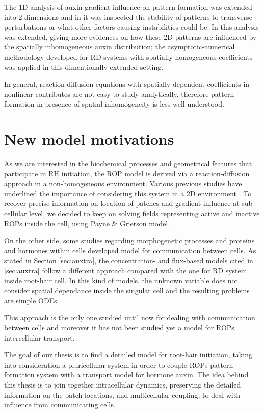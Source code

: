 The 1D analysis of auxin gradient influence on pattern formation was extended into 2 dimensions and in \cite{intra2} it was inspected the stability of patterns to transverse perturbations or what other factors causing instabilities could be. In \cite{intra1_R} this analysis was extended, giving more evidences on how these 2D patterns are influenced by the spatially inhomogeneous auxin distribution; the asymptotic-numerical methodology developed for RD systems with spatially homogeneous coefficients was applied in this dimentionally extended setting.

In general, reaction-diffusion equations with spatially dependent coefficients in nonlinear contributes are not easy to study analytically, therefore pattern formation in presence of spatial inhomogeneity is less well understood.

\section{New model motivations}
As we are interested in the biochemical processes and geometrical features that participate in RH initiation, the ROP model is derived via a reaction-diffusion approach in a non-homogeneous environment. Various previous studies have underlined the importance of considering this system in a 2D environment \cite{phdthesis:victor, intra2, intra1_R}. To recover precise information on location of patches and gradient influence at sub-cellular level, we decided to keep on solving fields representing active and inactive ROPs inside the cell, using Payne \& Grierson model \cite{payne}.

On the other side, some studies regarding morphogenetic processes and proteins and hormones within cells  developed model for communication between cells. As stated in Section \ref{sec:auxtra}, the concentration- and flux-based models cited in \ref{sec:auxtra} follow a different approach compared with the one for RD system inside root-hair cell. In this kind of models, the unknown variable does not consider spatial dependance inside the singular cell and the resulting problems are simple ODEs.

This approach is the only one studied until now for dealing with communication between cells and moreover it has not been studied yet a model for ROPs intercellular transport.

The goal of our thesis is to find a detailed model for root-hair initiation, taking into consideration a pluricellular system in order to couple ROPs pattern formation system with a transport model for hormone auxin. The idea behind this thesis is to join together intracellular dynamics, preserving the detailed information on the patch locations, and multicellular coupling, to deal with influence from communicating cells.

